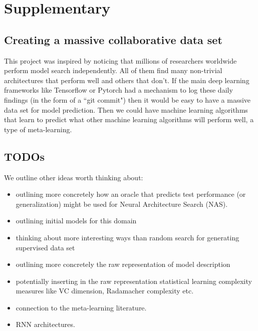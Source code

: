\documentclass{article}
\begin{document}
\section{Supplementary}

\subsection{Creating a massive collaborative data set}

This project was inspired by noticing that millions of researchers worldwide perform model search independently.
All of them find many non-trivial architectures that perform well and others that don't.
If the main deep learning frameworks like Tensorflow or Pytorch had a mechanism to log these daily findings (in the form of a ``git commit") then it would be easy to have a massive data set for model prediction.
Then we could have machine learning algorithms that learn to predict what other machine learning algorithms will perform well, a type of meta-learning.


\subsection{TODOs}

We outline other ideas worth thinking about:

\begin{itemize}
    \item outlining more concretely how an oracle that predicts test performance (or generalization) might be used for Neural Architecture Search (NAS).
    \item outlining initial models for this domain
    \item thinking about more interesting ways than random search for generating supervised data set
    \item outlining more concretely the raw representation of model description
    \item potentially inserting in the raw representation statistical learning complexity measures like VC dimension, Radamacher complexity etc.
    \item connection to the meta-learning literature.
    \item RNN architectures.
\end{itemize}
\end{document}
